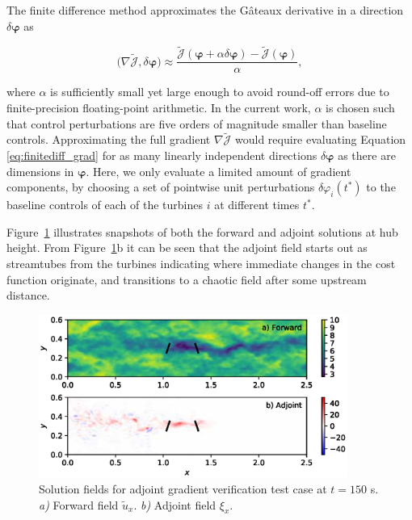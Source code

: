 \documentclass[energies,article,submit,moreauthors,latex,10pt,a4paper]{mdpi}
\newcommand{\bs}[1]{\boldsymbol{#1}}
\newcommand{\Jtilde}{\tilde{\mathscr{J}}}
\newcommand{\innerproduct}[2]{\bigg( #1, #2 \bigg)}
\begin{document}
The finite difference method approximates the G\^ateaux derivative in a direction $\delta \bs{\varphi}$ as

\begin{equation}\label{eq:finitediff_grad}
\innerproduct{\nabla \Jtilde}{\delta \bs{\varphi}} \approx \frac{\Jtilde(\bs{\varphi} + \alpha \delta \bs{\varphi}) - \Jtilde(\bs{\varphi})}{\alpha},
\end{equation}

\noindent where $\alpha$ is sufficiently small yet large enough to avoid round-off errors due to finite-precision floating-point arithmetic. In the current work, $\alpha$ is chosen such that control perturbations are five orders of magnitude smaller than baseline controls. Approximating the full gradient $\nabla \Jtilde$ would require evaluating Equation \eqref{eq:finitediff_grad} for as many linearly independent directions $\delta \bs{\varphi}$ as there are dimensions in $\bs{\varphi}$. Here, we only evaluate a limited amount of gradient components, by choosing a set of pointwise unit perturbations $\delta \varphi_i(t^*)$ to the baseline controls of each of the turbines $i$ at different times $t^*$. 

Figure~\ref{fig:forwardfield_adjointfield} illustrates snapshots of both the forward and adjoint solutions at hub height. From Figure~\ref{fig:forwardfield_adjointfield}b it can be seen that the adjoint field starts out as streamtubes from the turbines indicating where immediate changes in the cost function originate, and transitions to a chaotic field after some upstream distance. 

\begin{figure}[ht]
	\centering
	\includegraphics[width=0.9\textwidth]{figure18}
	\caption{Solution fields for adjoint gradient verification test case at $t=150$ s. \emph{a)} Forward field $\tilde{u}_x$. \emph{b)} Adjoint field $\xi_x$. \label{fig:forwardfield_adjointfield}}
\end{figure}
\end{document}
